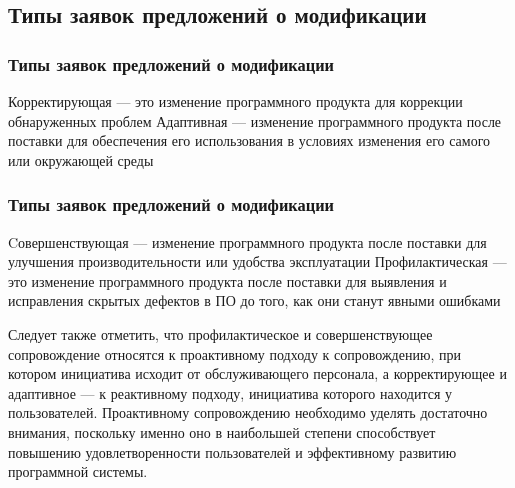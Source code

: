 \documentclass{industrial-development}
\begin{document}
\lecturenotes


\subsection{Типы заявок предложений о модификации}
\begin{frame} \frametitle{Типы заявок предложений о модификации}
	\begin{definition}
		\alert{Корректирующая} --- это изменение программного продукта для коррекции обнаруженных проблем\newline
		\alert{Адаптивная} --- изменение программного продукта после поставки для обеспечения его использования в условиях изменения его самого или окружающей среды
	\end{definition}
\end{frame}


\begin{frame} \frametitle{Типы заявок предложений о модификации}
	\begin{definition}
		\alert{Cовершенствующая} --- изменение программного продукта после поставки для улучшения производительности или удобства эксплуатации\newline
		\alert{Профилактическая} ---  это изменение программного продукта после поставки для выявления и исправления скрытых дефектов в ПО до того, как они станут явными ошибками
	\end{definition}
\end{frame}

\lecturenotes
Следует также отметить, что профилактическое и совершенствующее сопровождение относятся к проактивному подходу к сопровождению, при котором инициатива исходит от обслуживающего персонала, а корректирующее и адаптивное — к реактивному подходу, инициатива которого находится у пользователей. 
Проактивному сопровождению необходимо уделять достаточно внимания, поскольку именно оно в наибольшей степени способствует повышению удовлетворенности пользователей и эффективному развитию программной системы. 

\end{document}
